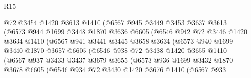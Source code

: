 \begin{lexlean}{R15}
\begin{coremodule}
                        @72
                        @3454
                        @1420
                        @3613
                        @1410
                        (@6567
                          @945
                          @3449
                          @3453
                          @3637
                          @3613
                          (@6573
                            @944
                            @1699
                            @3448
                            @1870
                            @3636
                            @6605
                            (@6546
                              @942
                              @72
                              @3446
                              @1420
                              @3634
                              @1410
                              (@6567
                                @941
                                @3441
                                @3445
                                @3658
                                @3634
                                (@6573
                                  @940
                                  @1699
                                  @3440
                                  @1870
                                  @3657
                                  @6605
                                  (@6546
                                    @938
                                    @72
                                    @3438
                                    @1420
                                    @3655
                                    @1410
                                    (@6567
                                      @937
                                      @3433
                                      @3437
                                      @3679
                                      @3655
                                      (@6573
                                        @936
                                        @1699
                                        @3432
                                        @1870
                                        @3678
                                        @6605
                                        (@6546
                                          @934
                                          @72
                                          @3430
                                          @1420
                                          @3676
                                          @1410
                                          (@6567
                                            @933

\end{coremodule}
\end{lexlean}
